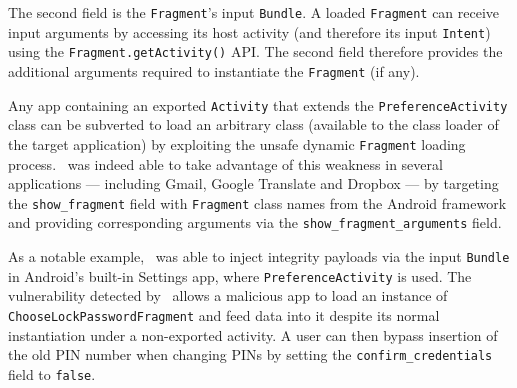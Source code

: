 The second field is the \texttt{Fragment}'s input {\tt Bundle}. A loaded \texttt{Fragment} can
receive input arguments by accessing its host activity (and therefore
its input \texttt{Intent}) using the \texttt{Fragment.getActivity()} API. The second field therefore provides the additional arguments required to instantiate the {\tt Fragment} (if any).

Any app containing an exported {\tt Activity} that extends the {\tt PreferenceActivity} class can be subverted to load an arbitrary class (available to the class loader of the target application)
by exploiting the unsafe dynamic {\tt Fragment} loading process. \Tool\ was indeed able to take advantage of this weakness
in several applications --- including Gmail, Google Translate and Dropbox --- by
targeting the \texttt{show\_fragment}  field with {\tt Fragment} class names from the Android framework and providing corresponding arguments via the \texttt{show\_fragment\_arguments} field. 


As a notable example, \Tool\ was able to inject integrity payloads via the input {\tt Bundle} in Android's built-in Settings app, where {\tt PreferenceActivity} is used. 
The vulnerability detected by \Tool\ allows a malicious app to load an instance of \texttt{ChooseLockPasswordFragment}
and feed data into it despite its normal instantiation under a non-exported
activity. A user can then bypass insertion of the old PIN number when changing PINs by setting the \texttt{confirm\_credentials} field to \texttt{false}.


